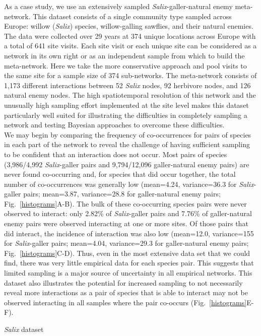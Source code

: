 \documentclass[12pt]{article}
\begin{document}
\begin{floatbox}{}

    \indent As a case study, we use an extensively sampled \emph{Salix}-galler-natural enemy meta-network. This dataset consists of a single community type sampled across Europe: willow (\emph{Salix}) species, willow-galling sawflies, and their natural enemies. The data were collected over 29 years at 374 unique locations across Europe with a total of 641 site visits. Each site visit or each unique site can be considered as a network in its own right or as an independent sample from which to build the meta-network. Here we take the more conservative approach and pool visits to the same site for a sample size of 374 sub-networks. The meta-network consists of 1,173 different interactions between 52 \emph{Salix} nodes, 92 herbivore nodes, and 126 natural enemy nodes. The high spatiotemporal resolution of this network and the unusually high sampling effort implemented at the site level makes this dataset particularly well suited for illustrating the difficulties in completely sampling a network and testing Bayesian approaches to overcome these difficulties.\\
    \indent We may begin by comparing the frequency of co-occurrences for pairs of species in each part of the network to reveal the challenge of having sufficient sampling to be confident that an interaction does not occur. Most pairs of species (3,986/4,992 \emph{Salix}-galler pairs and  9,794/12,096 galler-natural enemy pairs) are never found co-occurring and, for species that did occur together, the total number of co-occurrences was generally low (mean=4.24, variance=36.3 for \emph{Salix}-galler pairs; mean=3.87, variance=28.8 for galler-natural enemy pairs; Fig.~\ref{histograms}A-B). The bulk of these co-occurring species pairs were never observed to interact: only 2.82\% of \emph{Salix}-galler pairs and 7.76\% of galler-natural enemy pairs were observed interacting at one or more sites. Of those pairs that did interact, the incidence of interaction was also low (mean=12.0, variance=155 for \emph{Salix}-galler pairs; mean=4.04, variance=29.3 for galler-natural enemy pairs; Fig.~\ref{histograms}C-D). Thus, even in the most extensive data set that we could find, there was very little empirical data for each species pair. This suggests that limited sampling is a major source of uncertainty in all empirical networks. This dataset also illustrates the potential for increased sampling to not necessarily reveal more interactions as a pair of species that is able to interact may not be observed interacting in all samples where the pair co-occurs (Fig.~\ref{histograms}E-F).
  \caption{\emph{Salix} dataset}
  \label{box1}
\end{floatbox}
\end{document}
